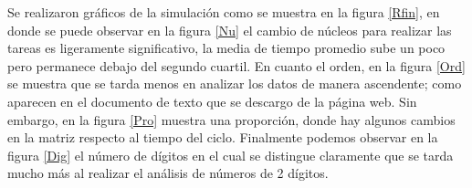 \documentclass[12pt, letterpaper] {article}
\begin{document}
Se realizaron gráficos de la simulación como se muestra en la figura \ref{Rfin}, en donde se puede observar en la figura \ref{Nu} el cambio de núcleos para realizar las tareas es ligeramente significativo, la media de tiempo promedio sube un poco pero permanece debajo del segundo cuartil. En cuanto el orden, en la figura \ref{Ord} se muestra que se tarda menos en analizar los datos de manera ascendente; como aparecen en el documento de texto que se descargo de la página web. Sin embargo, en la figura \ref{Pro} muestra una proporción, donde hay algunos cambios en la matriz respecto al tiempo del ciclo. Finalmente podemos observar en la figura \ref{Dig} el número de dígitos en el cual se distingue claramente que se tarda mucho más al realizar el análisis de números de 2 dígitos.

\begin{figure}[H]
\centering
{}\vspace{-4mm}
\vspace{-4mm}

\end{figure}
\end{document}
